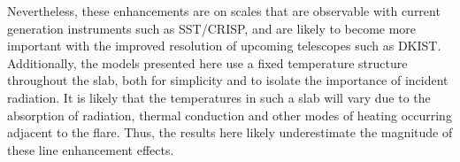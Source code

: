 Nevertheless, these enhancements are on scales that are observable with current generation instruments such as SST/CRISP, and are likely to become more important with the improved resolution of upcoming telescopes such as DKIST.
Additionally, the models presented here use a fixed temperature structure throughout the slab, both for simplicity and to isolate the importance of incident radiation.
It is likely that the temperatures in such a slab will vary due to the absorption of radiation, thermal conduction and other modes of heating occurring adjacent to the flare.
Thus, the results here likely underestimate the magnitude of these line enhancement effects.